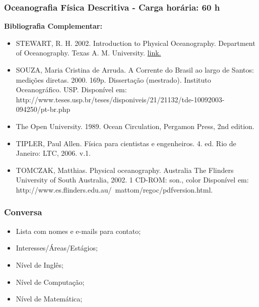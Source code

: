 \begin{frame}
    \frametitle{Oceanografia Física Descritiva - Carga horária: 60 h}
    {\scriptsize
    {\bf Bibliografia Complementar:}
    \begin{itemize}
        \item STEWART, R. H. 2002. Introduction to Physical Oceanography.
              Department of Oceanography. Texas A. M. University.
              \href{http://oceanworld.tamu.edu/resources/ocng_textbook/contents.html}{link.}
        \item SOUZA, Maria Cristina de Arruda. A Corrente do Brasil ao largo de
              Santos: medições diretas. 2000. 169p. Dissertação  (mestrado).
              Instituto Oceanográfico. USP. Disponível  em:
              http://www.teses.usp.br/teses/disponiveis/21/21132/tde-10092003-094250/pt-br.php
        \item The Open University. 1989. Ocean Circulation, Pergamon Press,
              2nd edition.
        \item TIPLER, Paul Allen. Física para cientistas e engenheiros. 4.
              ed. Rio de Janeiro: LTC, 2006. v.1.
        \item TOMCZAK, Matthias. Physical oceanography. Australia The
              Flinders University of South Australia, 2002. 1 CD-ROM:
              son., color Disponível em:
              http://www.es.flinders.edu.au/~mattom/regoc/pdfversion.html.
    \end{itemize}
    }
\end{frame}

\begin{frame}
    \frametitle{Conversa}
    \begin{itemize}
        \item Lista com nomes e e-mails para contato;
        \item Interesses/Áreas/Estágios;
        \item Nível de Inglês;
        \item Nível de Computação;
        \item Nível de Matemática;
    \end{itemize}
\end{frame}

